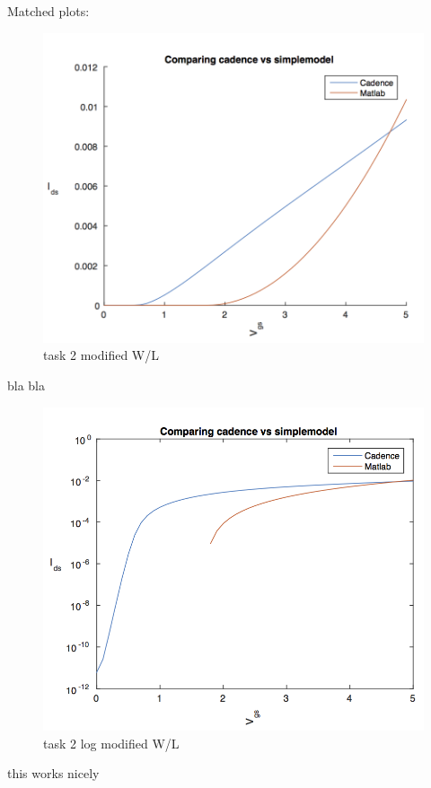 \documentclass[11pt,a4paper,final]{report}
\begin{document}
Matched plots:
\begin{figure}[h!btp]
\caption{task 2 modified W/L}
\includegraphics[scale=0.7]{2task2mod.png}
\end{figure}
bla bla
\begin{figure}[h!bt!p]
\caption{task 2 log modified W/L}
\includegraphics[scale=0.7]{2task2modlog.png}
\end{figure}

this works nicely
\end{document}
